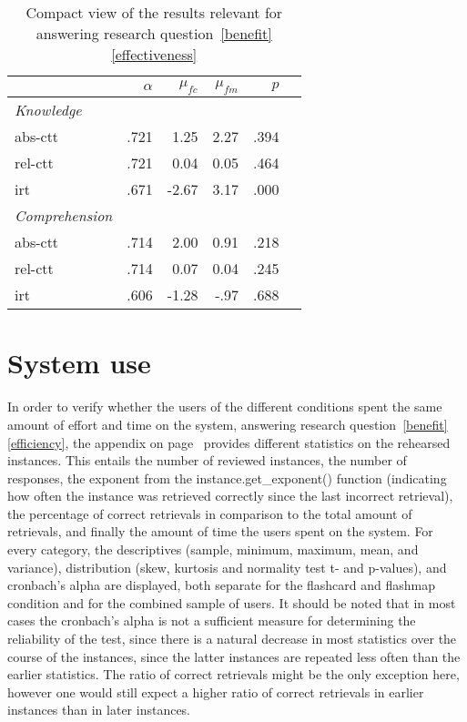 \begin{table}
    \centering
    \begin{tabular}{lrrrrr}
        \toprule
        & $\alpha$ & $\mu_{fc}$ & $\mu_{fm}$ & $p$ \\
        \midrule
        \emph{Knowledge} &&&& \\
        \midrule
        abs-ctt & .721 & 1.25 & 2.27 & .394 \\
        rel-ctt & .721 & 0.04 & 0.05 & .464 \\
        irt & .671 & -2.67 & 3.17 & .000 \\
        \midrule
        \emph{Comprehension} &&&& \\
        \midrule
        abs-ctt & .714 & 2.00 & 0.91 & .218 \\
        rel-ctt & .714 & 0.07 & 0.04 & .245\\
        irt & .606 & -1.28 & -.97 & .688 \\
        \bottomrule
    \end{tabular}
    \caption{Compact view of the results relevant for answering research question~\protect\ref{benefit}\protect\ref{effectiveness}}
    \label{tab:learning_gain_effect}
\end{table}

\section{System use}

In order to verify whether the users of the different conditions spent the same amount of effort and time on the system, answering research question~\ref{benefit}\ref{efficiency}, the  appendix on page~\pageref{app:instance_stats} provides different statistics on the rehearsed instances. This entails the number of reviewed instances, the number of responses, the exponent from the instance.get\_exponent() function (indicating how often the instance was retrieved correctly since the last incorrect retrieval), the percentage of correct retrievals in comparison to the total amount of retrievals, and finally the amount of time the users spent on the system. For every category, the descriptives (sample, minimum, maximum, mean, and variance), distribution (skew, kurtosis and normality test t- and p-values), and cronbach's alpha are displayed, both separate for the flashcard and flashmap condition and for the combined sample of users. It should be noted that in most cases the cronbach's alpha is not a sufficient measure for determining the reliability of the test, since there is a natural decrease in most statistics over the course of the instances, since the latter instances are repeated less often than the earlier statistics. The ratio of correct retrievals might be the only exception here, however one would still expect a higher ratio of correct retrievals in earlier instances than in later instances. 

